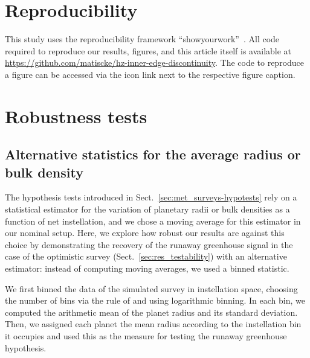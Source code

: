 \documentclass[twocolumn,twocolappendix]{aastex631}
\begin{document}
\section*{Reproducibility}
This study uses the reproducibility framework ``showyourwork''~\citep{Luger2021}.
All code required to reproduce our results, figures, and this article itself is available at \url{https://github.com/matiscke/hz-inner-edge-discontinuity}.
The code to reproduce a figure can be accessed via the icon link next to the respective figure caption.




\appendix
\section{Robustness tests}
\subsection{Alternative statistics for the average radius or bulk density}\label{app:binnedstats}
The hypothesis tests introduced in Sect.~\ref{sec:met_surveys-hypotests} rely on a statistical estimator for the variation of planetary radii or bulk densities as a function of net instellation, and we chose a moving average for this estimator in our nominal setup.
Here, we explore how robust our results are against this choice by demonstrating the recovery of the runaway greenhouse signal in the case of the optimistic survey (Sect.~\ref{sec:res_testability}) with an alternative estimator: instead of computing moving averages, we used a binned statistic.

We first binned the data of the simulated survey in instellation space, choosing the number of bins via the rule of \citet{Freedman1981} and using logarithmic binning.
In each bin, we computed the arithmetic mean of the planet radius and its standard deviation.
Then, we assigned each planet the mean radius according to the instellation bin it occupies and used this as the measure for testing the runaway greenhouse hypothesis.
\end{document}
